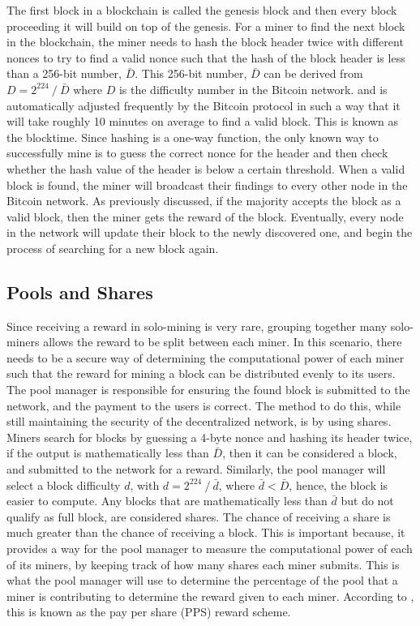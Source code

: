 \documentclass[runningheads]{llncs}
\begin{document}
The first block in a blockchain is called the genesis block and then every block proceeding it will build on top of the genesis. For a miner to find the next block in the blockchain, the miner needs to hash the block header twice with different nonces to try to find a valid nonce such that the hash of the block header is less than a 256-bit number, $\bar{D}$. This 256-bit number, $\bar{D}$ can be derived from $D=2^{224} \mathbin{/} \bar{D}$ where $D$ is the difficulty number in the Bitcoin network. and is automatically adjusted frequently by the Bitcoin protocol in such a way that it will take roughly %
10 minutes on average to find a valid block. This is known as the blocktime. Since hashing is a one-way function, the only known way to successfully mine is to guess the correct nonce for the header and then check whether the hash value of the header is below a certain threshold. When a valid block is found, the miner will broadcast their findings to every other node in the Bitcoin network. As previously discussed, if the majority accepts the block as a valid block, then the miner gets the reward of the block. Eventually, every node in the network will update their block to the newly discovered one, and begin the process of searching for a new block again.

\subsection{Pools and Shares}
Since receiving a reward in solo-mining is very rare, grouping together many solo-miners allows the reward to be split between each miner. In this scenario, there needs to be a secure way of determining the computational power of each miner such that the reward for mining a block can be distributed evenly to its users. The pool manager is responsible for ensuring the found block is submitted to the network, and the payment to the users is correct. The method to do this, while still maintaining the security of the decentralized network, is by using shares. Miners search for blocks by guessing a 4-byte nonce and hashing its header twice, if the output is mathematically less than $\bar{D}$, then it can be considered a block, and submitted to the network for a reward. Similarly, the pool manager will select a block difficulty $d$, with $d=2^{224} \mathbin{/} \bar{d}$, where $\bar{d}<\bar{D}$, hence, the block is easier to compute. Any blocks that are mathematically less than $\bar{d}$ but do not qualify as full block, are considered shares. The chance of receiving a share is much greater than the chance of receiving a block. This is important because, it provides a way for the pool manager to measure the computational power of each of its miners, by keeping track of how many shares each miner submits. This is what the pool manager will use to determine the percentage of the pool that a miner is contributing to determine the reward given to each miner. According to \cite{b2}, this is known as the pay per share (PPS) reward scheme.
\end{document}
